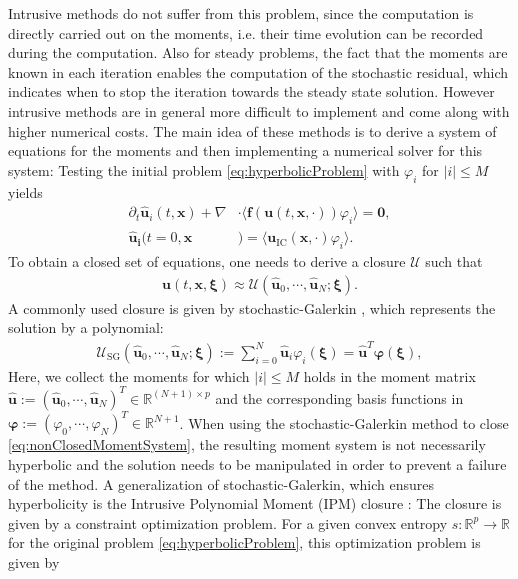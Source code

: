 Intrusive methods do not suffer from this problem, since the computation is directly carried out on the moments, i.e. their time evolution can be recorded during the computation. Also for steady problems, the fact that the moments are known in each iteration enables the computation of the stochastic residual, which indicates when to stop the iteration towards the steady state solution. However intrusive methods are in general more difficult to implement and come along with higher numerical costs. The main idea of these methods is to derive a system of equations for the moments and then implementing a numerical solver for this system: Testing the initial problem \eqref{eq:hyperbolicProblem} with $\varphi_i$ for $|i|\leq M$ yields
\begin{subequations}\label{eq:nonClosedMomentSystem}
\begin{align}
\partial_t \bm{\hat u}_i(t,\bm{x}) + \nabla&\cdot\langle\bm{f}(\bm{u}(t,\bm{x},\cdot)) \varphi_i\rangle = \bm{0}, \\
\bm{\hat u_i}(t=0,\bm{x}&) = \langle\bm{u}_{\text{IC}}(\bm{x},\cdot)\varphi_i\rangle.
\end{align}
\end{subequations}
To obtain a closed set of equations, one needs to derive a closure $\mathcal{U}$ such that 
\begin{align*}
\bm{u}(t,\bm x,\bm \xi) \approx \mathcal{U}(\bm{\hat u}_0,\cdots,\bm{\hat u}_N;\bm\xi).
\end{align*}
A commonly used closure is given by stochastic-Galerkin \cite{ghanem2003stochastic}, which represents the solution by a polynomial:
\begin{align*}
\mathcal{U}_{\text{SG}}(\bm{\hat u}_0,\cdots,\bm{\hat u}_N;\bm\xi):= \sum_{i=0}^N \bm{\hat{u}}_i\varphi_i(\bm{\xi}) = \hat{\bm u}^T\bm{\varphi}(\bm\xi),
\end{align*}
Here, we collect the moments for which $\vert i \vert \leq M$ holds in the moment matrix $\bm{\hat{u}}:=(\bm{\hat{u}}_0,\cdots,\bm{\hat{u}}_N)^T\in\mathbb{R}^{(N+1) \times p}$ and the corresponding basis functions in $\bm{\varphi}:=(\varphi_0,\cdots,\varphi_N)^T\in\mathbb{R}^{N+1}$. When using the stochastic-Galerkin method to close \eqref{eq:nonClosedMomentSystem}, the resulting moment system is not necessarily hyperbolic and the solution needs to be manipulated \cite{schlachter2018hyperbolicity} in order to prevent a failure of the method. A generalization of stochastic-Galerkin, which ensures hyperbolicity is the Intrusive Polynomial Moment (IPM) closure \cite{poette2009uncertainty}: The closure is given by a constraint optimization problem. For a given convex entropy $s:\mathbb{R}^p\to\mathbb{R}$ for the original problem \eqref{eq:hyperbolicProblem}, this optimization problem is given by
